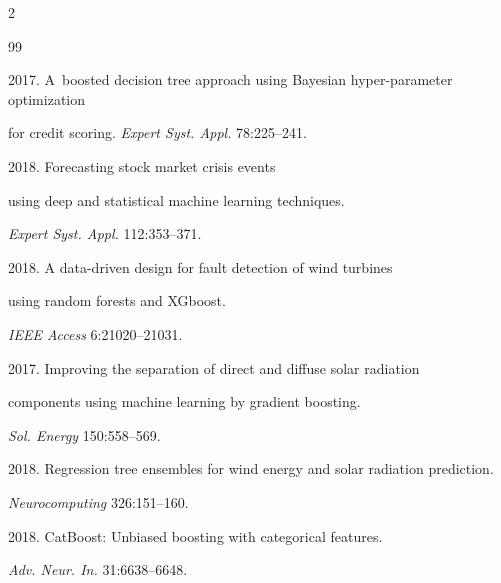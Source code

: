 \begin{multicols}{2}
{{\begin{thebibliography}{99}

2017. A~boosted decision tree approach using Bayesian hyper-parameter optimization 

for credit scoring. \textit{Expert Syst. Appl.} 78:225--241.




 2018. Forecasting stock market crisis events 

using deep and statistical machine learning techniques. 

\textit{Expert Syst. Appl.} 112:353--371.





 2018. A data-driven design for fault detection of wind turbines 

 using random forests and XGboost. 

 \textit{IEEE Access} 6:21020--21031.





 2017. Improving the separation of direct and diffuse solar radiation 

 components using machine learning by gradient boosting. 

 \textit{Sol. Energy} 150:558--569.





2018. Regression tree ensembles for wind energy and solar radiation prediction. 

\textit{Neurocomputing} 326:151--160.





 2018. CatBoost: Unbiased boosting with categorical features. 

 \textit{Adv. Neur. In.} 31:6638--6648.




\end{thebibliography}}}
\end{multicols}
